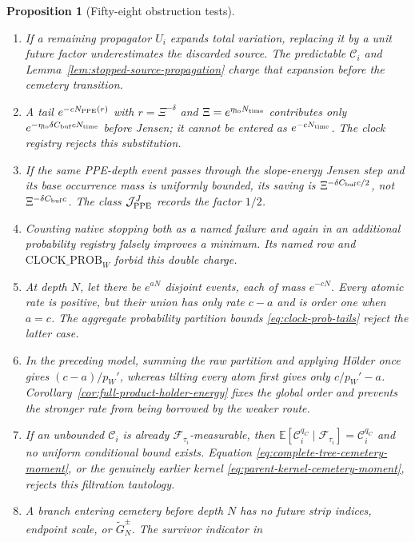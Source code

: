 \documentclass[11pt]{article}
\newtheorem{proposition}[theorem]{Proposition}
\begin{document}
\begin{proposition}[Fifty-eight obstruction tests]
\begin{enumerate}[label=\textup{(T\arabic*)}]
      rejects the missing envelope.
\item If a remaining propagator $U_i$ expands total variation, replacing it
      by a unit future factor underestimates the discarded source.  The
      predictable $\mathcal C_i$ and
      Lemma~\ref{lem:stopped-source-propagation} charge that expansion before
      the cemetery transition.
\item A tail $e^{-cN_{\rm PPE}(r)}$ with $r=\Xi^{-\delta}$ and
      $\Xi=e^{\eta_{\rm lo}N_{\rm time}}$ contributes only
      $e^{-\eta_{\rm lo}\delta C_{\rm buf}cN_{\rm time}}$ before Jensen; it
      cannot be entered as $e^{-cN_{\rm time}}$.  The clock registry rejects
      this substitution.
\item If the same PPE-depth event passes through the slope-energy Jensen
      step and its base occurrence mass is uniformly bounded, its saving is
      $\Xi^{-\delta C_{\rm buf}c/2}$, not
      $\Xi^{-\delta C_{\rm buf}c}$.  The class
      $\mathcal J_{\rm PPE}^{J}$ records the factor $1/2$.
\item Counting native stopping both as a named failure and again in an
      additional probability registry falsely improves a minimum.  Its
      named row and \(\mathrm{CLOCK\_PROB}_{W}\) forbid this double charge.
\item At depth $N$, let there be $e^{aN}$ disjoint events, each of mass
      $e^{-cN}$.  Every atomic rate is positive, but their union has only
      rate $c-a$ and is order one when $a=c$.  The aggregate probability
      partition bounds \eqref{eq:clock-prob-tails} reject the latter case.
\item In the preceding model, summing the raw partition and applying
      H\"older once gives $(c-a)/p_W'$, whereas tilting every atom first gives
      only $c/p_W'-a$.  Corollary~\ref{cor:full-product-holder-energy}
      fixes the global order and prevents the stronger rate from being
      borrowed by the weaker route.
\item If an unbounded $\mathcal C_i$ is already
      $\mathcal F_{\tau_i}$-measurable, then
      $\mathbb E[\mathcal C_i^{q_C}\mid\mathcal F_{\tau_i}]
      =\mathcal C_i^{q_C}$ and no uniform conditional bound exists.
      Equation \eqref{eq:complete-tree-cemetery-moment}, or the genuinely
      earlier kernel \eqref{eq:parent-kernel-cemetery-moment}, rejects this
      filtration tautology.
\item A branch entering cemetery before depth $N$ has no future strip indices,
      endpoint scale, or $\widetilde G_N^\pm$.  The survivor indicator in

\end{enumerate}
\end{proposition}
\end{document}
